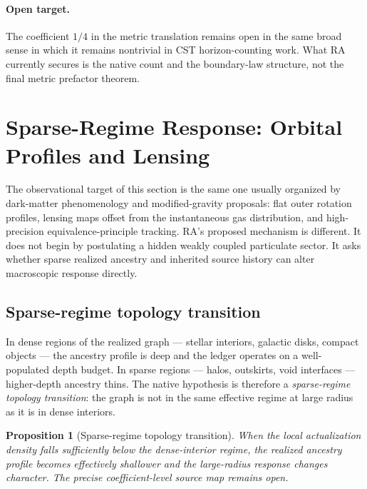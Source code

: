 \documentclass[11pt]{article}
\newtheorem{proposition}{Proposition}
\begin{document}
\paragraph{Open target.} The coefficient $1/4$ in the metric translation remains open in the same broad sense in which it remains nontrivial in CST horizon-counting work. What RA currently secures is the native count and the boundary-law structure, not the final metric prefactor theorem.

\section{Sparse-Regime Response: Orbital Profiles and Lensing}
\label{sec:sparse}

The observational target of this section is the same one usually organized by dark-matter phenomenology and modified-gravity proposals: flat outer rotation profiles, lensing maps offset from the instantaneous gas distribution, and high-precision equivalence-principle tracking. RA's proposed mechanism is different. It does not begin by postulating a hidden weakly coupled particulate sector. It asks whether sparse realized ancestry and inherited source history can alter macroscopic response directly.

\subsection{Sparse-regime topology transition}

In dense regions of the realized graph --- stellar interiors, galactic disks, compact objects --- the ancestry profile is deep and the ledger operates on a well-populated depth budget. In sparse regions --- halos, outskirts, void interfaces --- higher-depth ancestry thins. The native hypothesis is therefore a \emph{sparse-regime topology transition}: the graph is not in the same effective regime at large radius as it is in dense interiors.

\begin{proposition}[Sparse-regime topology transition]
When the local actualization density falls sufficiently below the dense-interior regime, the realized ancestry profile becomes effectively shallower and the large-radius response changes character. The precise coefficient-level source map remains open.
\end{proposition}
\end{document}
